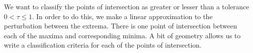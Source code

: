 %
%

We want to classify the points of intersection as greater or lesser than a tolerance $0 < \tau \le 1$. In order to do this, we make a linear approximation to the perturbation between the extrema. There is one point of intersection between each of the maxima and corresponding minima. A bit of geometry allows us to write a classification criteria for each of the points of intersection.

